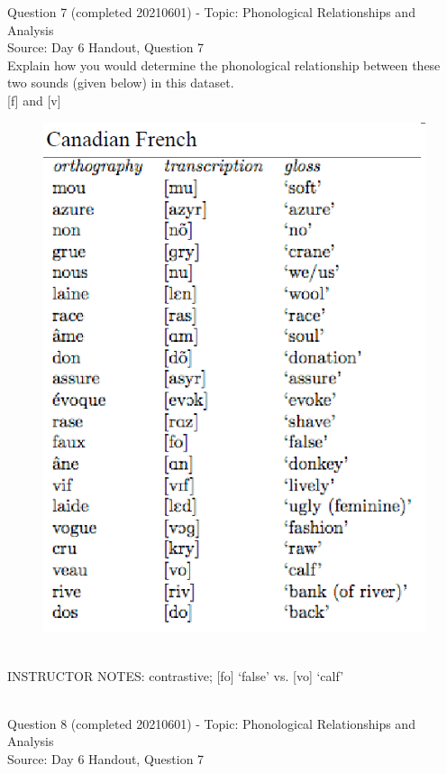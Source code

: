 \documentclass[12pt]{article}
\begin{document}
{\large Question 7} (completed 20210601) - Topic: Phonological Relationships and Analysis\\
Source: Day 6 Handout, Question 7\\

Explain how you would determine the phonological relationship between these two sounds (given below) in this dataset.\\

{[f]} and {[v]}

\begin{figure}[H]
\includegraphics{../images/canadianfrench.png}
\end{figure}

~\\
INSTRUCTOR NOTES: contrastive; [fo] ‘false’ vs. [vo] ‘calf’


~\\

{\large Question 8} (completed 20210601) - Topic: Phonological Relationships and Analysis\\
Source: Day 6 Handout, Question 7\\
\end{document}
